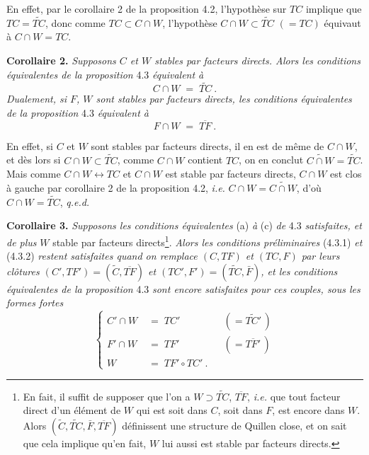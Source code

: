 \documentclass[11pt]{article}
\newcommand{\printedpage}[1]{\marginpar{\footnotesize p.~#1}}
\newcommand{\msp}[1]{\marginpar{\footnotesize [#1]}}
\begin{document}
\printedpage{24}

\msp{page 35}
En effet, par le corollaire 2 de la proposition 4.2, l'hypothèse sur $TC$ implique que $TC = \widetilde{TC}$, donc comme $TC \subset C{\cap}W$, l'hypothèse $C{\cap}W \subset \widetilde{TC}$ $(= TC)$ équivaut à $C{\cap}W = TC$.

\textbf{Corollaire 2.} \textit{Supposons $C$ et $W$ stables par facteurs directs. Alors les conditions équivalentes de la proposition} 4.3 \textit{équivalent à}
\[
C\cap W \;=\; \widetilde{TC}\ . \tag*{(4.3.5)}
\]
\textit{Dualement, si $F$, $W$ sont stables par facteurs directs, les conditions équivalentes de la proposition} 4.3 \textit{équivalent à}
\[
F\cap W \;=\; \overline{TF}\ . \tag*{(4.3.5$'$)}
\]

En effet, si $C$ et $W$ sont stables par facteurs directs, il en est de même de $C\cap W$, et dès lors si $C\cap W\subset\widetilde{TC}$, comme $C\cap W$ contient $TC$, on en conclut $\widetilde{C\cap W}=\widetilde{TC}$. Mais comme $C\cap W\longleftrightarrow TC$ et $C\cap W$ est stable par facteurs directs, $C\cap W$ est clos à gauche par corollaire 2 de la proposition 4.2, \textit{i.e.} $C\cap W=\widetilde{C\cap W}$, d'où $C\cap W=\widetilde{TC}$, \quad \textit{q.e.d.}

\textbf{Corollaire 3.} \textit{Supposons les conditions équivalentes} (a) \textit{à} (c) \textit{de} 4.3 \textit{satisfaites, et de plus} $W$ stable par facteurs directs\footnote[12]{En fait, il suffit de supposer que l'on a $W\supset\widetilde{TC}$, $\overline{TF}$, \textit{i.e.} que tout facteur direct d'un élément de $W$ qui est soit dans $C$, soit dans $F$, est encore dans $W$. Alors $(\widetilde{C},\widetilde{TC},\bar{F},\overline{TF})$ définissent une structure de Quillen close, et on sait que cela implique qu'en fait, $W$ lui aussi est stable par facteurs directs.}. \textit{Alors les conditions préliminaires} (4.3.1) \textit{et} (4.3.2) \textit{restent satisfaites quand on remplace $(C,TF)$ et $(TC,F)$ par leurs clôtures $(C',TF')=(\widetilde{C},\overline{TF})$ et $(TC',F')=(\widetilde{TC},\bar{F})$, et les conditions équivalentes de la proposition} 4.3 \textit{sont encore satisfaites pour ces couples, sous les formes fortes}
\[
\left\{
\begin{aligned}
C'\cap W &\;=\; TC' && (=\widetilde{TC'}\,)\\
F'\cap W &\;=\; TF' && (=\overline{TF'}\,)\\
W &\;=\; TF'\circ TC'\ .
\end{aligned}
\right.
\tag*{(4.3.6)}
\]
\end{document}
